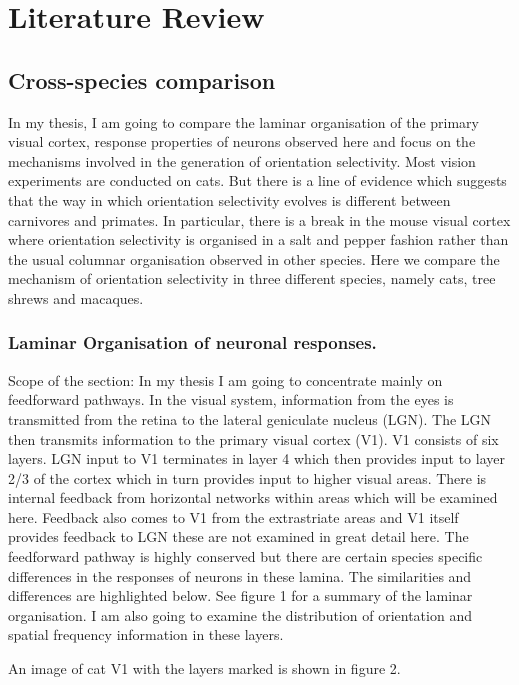 
	\chapter{Literature Review} 
		\section{Cross-species comparison}
			In my thesis, I am going to compare the laminar organisation of the primary visual cortex, response properties of neurons observed here and focus on the mechanisms involved in the generation of orientation selectivity. Most vision experiments are conducted on cats. But there is a line of evidence which suggests that the way in which orientation selectivity evolves is different between carnivores and primates. In particular, there is a break in the  mouse visual cortex where orientation selectivity is organised in a salt and pepper fashion rather than the usual columnar organisation observed in other species. Here we compare the mechanism of orientation selectivity in three different species, namely cats, tree shrews and macaques. 
			\subsection{Laminar Organisation of neuronal responses.}
				Scope of the section: In my thesis I am going to concentrate mainly on feedforward pathways. In the visual system, information from the eyes is transmitted  from the retina to the lateral geniculate nucleus (LGN). The LGN then transmits information to the primary visual cortex (V1). V1 consists of six layers. LGN input to V1 terminates in layer 4 which then provides input to layer 2/3 of the cortex which in turn provides input to higher visual areas. There is internal feedback from horizontal networks within  areas which will be examined here. Feedback also comes to V1 from the extrastriate areas and V1 itself provides feedback to LGN these are not examined in great detail here. The feedforward pathway is highly conserved but there are certain species specific differences in the responses of neurons in these lamina. The similarities and differences are highlighted below. See figure 1 for a summary of the laminar organisation. I am also going to examine the distribution of orientation and spatial frequency information in these layers.
	
				An image of cat V1 with the layers marked is shown in figure 2.
